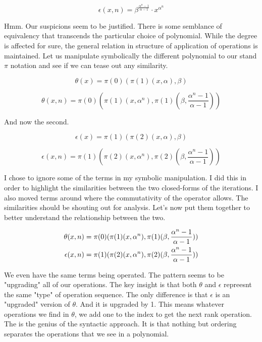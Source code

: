 \begin{equation}
    \epsilon(x,n) = \beta^{\frac{\alpha^n-1}{\alpha-1}} \cdot x^{\alpha^n}
\end{equation}

Hmm. Our suspicions seem to be justified. There is some semblance of
equivalency that transcends the particular choice of polynomial. While the
degree is affected for sure, the general relation in structure of application
of operations is maintained. Let us manipulate symbolically the different
polynomial to our stand $\pi$ notation and see if we can tease out any
similarity.

\begin{equation}
    \theta(x) = \pi(0)(\pi(1)(x, \alpha), \beta)
\end{equation}

\begin{equation}
    \theta(x,n) = \pi(0)(\pi(1)(x, \alpha^n), \pi(1)(\beta, \frac{\alpha^n-1}{\alpha-1}))
\end{equation}

And now the second.

\begin{equation}
    \epsilon(x) = \pi(1)(\pi(2)(x, \alpha), \beta)
\end{equation}

\begin{equation}
    \epsilon(x,n) = \pi(1)(\pi(2)(x, \alpha^n), \pi(2)(\beta, \frac{\alpha^n-1}{\alpha-1}))
\end{equation}

I chose to ignore some of the terms in my symbolic manipulation. I did this in
order to highlight the similarities between the two closed-forms of the
iterations. I also moved terms around where the commutativity of the operator
allows. The similarities should be shouting out for analysis. Let's now put
them together to better understand the relationship between the two.

\begin{align}
    \theta(x,n) = \pi(0)(\pi(1)(x, \alpha^n), \pi(1)(\beta, \frac{\alpha^n-1}{\alpha-1})) \notag \\
    \epsilon(x,n) = \pi(1)(\pi(2)(x, \alpha^n), \pi(2)(\beta, \frac{\alpha^n-1}{\alpha-1})) \notag
\end{align}

We even have the same terms being operated. The pattern seems to be "upgrading"
all of our operations. The key insight is that both $\theta$ and $\epsilon$
repreesnt the same "type" of operation sequence. The only difference is that
$\epsilon$ is an "upgraded" version of $\theta$. And it is upgraded by 1. This
means whatever operations we find in $\theta$, we add one to the index to get
the next rank operation. The is the genius of the syntactic approach. It is
that nothing but ordering separates the operations that we see in a polynomial.

